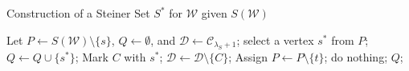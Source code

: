 \documentclass[letterpaper,11pt]{article}
\begin{document}
\begin{algorithm}[h]
\caption{Construction of a Steiner Set $S^*$ for ${\mathcal W}$ given $S({\mathcal W})$}
\label{alg : constructing S*}
\begin{algorithmic}[1]
    \State Let $P\gets S({\mathcal W})\setminus \{s\}$, $Q\gets \emptyset$, and ${\mathcal D}\gets {\mathcal C}_{\lambda_S+1}$;
    \State select a vertex $s^*$ from $P$;
    \State $Q\gets Q\cup \{s^*\}$;
            \State Mark $C$ with $s^*$;
            \State ${\mathcal D}\gets {\mathcal D}\setminus \{C\}$;
                \State Assign $P\gets P\setminus \{t\}$;
            \EndFor
            \Else \State do nothing;
        \EndIf
    \EndFor
    \EndWhile
    \State \Return $Q$;
\EndProcedure
\end{algorithmic}
\end{algorithm}
\end{document}
